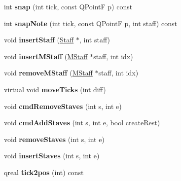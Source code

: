 \begin{DoxyCompactItemize}
int {\bfseries snap} (int tick, const Q\+PointF p) const
\item 
\mbox{\label{class_ms_1_1_measure_a3fbbf6806487dd85bb91db93ee7ab7e6}} 
int {\bfseries snap\+Note} (int tick, const Q\+PointF p, int staff) const
\item 
\mbox{\label{class_ms_1_1_measure_a4a56d5857dc5c20ac50916bc41de85bf}} 
void {\bfseries insert\+Staff} (\hyperlink{class_ms_1_1_staff}{Staff} $\ast$, int staff)
\item 
\mbox{\label{class_ms_1_1_measure_afc2cfccb91440ff0a05fba40148926eb}} 
void {\bfseries insert\+M\+Staff} (\hyperlink{class_ms_1_1_m_staff}{M\+Staff} $\ast$staff, int idx)
\item 
\mbox{\label{class_ms_1_1_measure_ad8f3420c8336dc414b957c10b810e1ac}} 
void {\bfseries remove\+M\+Staff} (\hyperlink{class_ms_1_1_m_staff}{M\+Staff} $\ast$staff, int idx)
\item 
\mbox{\label{class_ms_1_1_measure_a480edea99dfdb91d8deeb6e4161c59ed}} 
virtual void {\bfseries move\+Ticks} (int diff)
\item 
\mbox{\label{class_ms_1_1_measure_afb01f256d7010da687945637ae692326}} 
void {\bfseries cmd\+Remove\+Staves} (int s, int e)
\item 
\mbox{\label{class_ms_1_1_measure_a895e0b9f29745a00fce0d045a0c49c28}} 
void {\bfseries cmd\+Add\+Staves} (int s, int e, bool create\+Rest)
\item 
\mbox{\label{class_ms_1_1_measure_abc21efdbfd90e3732ea332c30273398d}} 
void {\bfseries remove\+Staves} (int s, int e)
\item 
\mbox{\label{class_ms_1_1_measure_a08e3d561c52a0c1b3a4a6b5995267c59}} 
void {\bfseries insert\+Staves} (int s, int e)
\item 
\mbox{\label{class_ms_1_1_measure_a370f72cd17612287a078e8ce7ce91535}} 
qreal {\bfseries tick2pos} (int) const
\item 

\end{DoxyCompactItemize}

